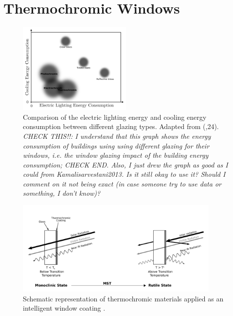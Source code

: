 \section{Thermochromic Windows}
\begin{figure}[h!]
  \centering
   \includegraphics[width=0.5\textwidth]{Figures/chromicGlassComparison.pdf}
   \caption{Comparison of the electric lighting energy and cooling energy consumption between different
   glazing types. Adapted from (\cite{Kamalisarvestani2013},24). \textit{CHECK THIS!!: I understand
      that this graph shows the energy consumption of buildings using using different
      glazing for their windows, i.e. the window glazing impact of the building energy consumption; CHECK END.
      Also, I just drew the graph as good as I could from Kamalisarvestani2013. Is it still okay to use it?
      Should I comment on it not being exact (in case someone try to use data or something, I don't know)?}
   }
\end{figure}
%
\begin{figure}[h!]
  \centering
   \includegraphics[width=0.9\textwidth]{Figures/TCcoating2.pdf}
   \caption{Schematic representation of thermochromic materials applied as an 
   intelligent window coating \cite{Kiria2010}.
   }
\end{figure}
%
%
